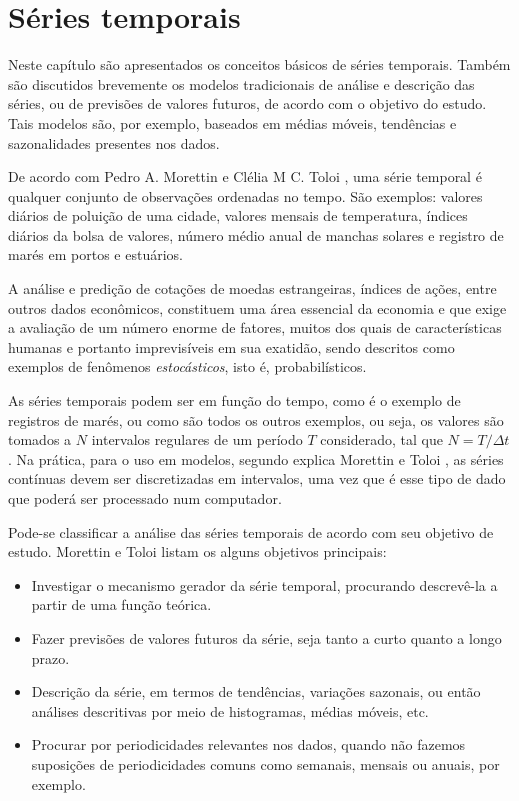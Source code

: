 

\chapter{Séries temporais}
\label{cap:series}

Neste capítulo são apresentados os conceitos básicos de séries temporais. Também são discutidos brevemente os modelos tradicionais de análise e descrição das séries, ou de previsões de valores futuros, de acordo com o objetivo do estudo. Tais modelos são, por exemplo, baseados em médias móveis, tendências e sazonalidades presentes nos dados.

De acordo com Pedro A. Morettin e Clélia M C. Toloi \citep{morettin}, uma série temporal é qualquer conjunto de observações ordenadas no tempo. São exemplos: valores diários de poluição de uma cidade, valores mensais de temperatura, índices diários da bolsa de valores, número médio anual de manchas solares e registro de marés em portos e estuários.

A análise e predição de cotações de moedas estrangeiras, índices de ações, entre outros dados econômicos, constituem uma área essencial da economia e que exige a avaliação de um número enorme de fatores, muitos dos quais de características humanas e portanto imprevisíveis em sua exatidão, sendo descritos como exemplos de fenômenos \emph{estocásticos}, isto é, probabilísticos.

As séries temporais podem ser  em função do tempo, como é o exemplo de registros de marés, ou  como são todos os outros exemplos, ou seja, os valores são tomados a $N$ intervalos regulares de um período $T$ considerado, tal que $N = T/\Delta t$. Na prática, para o uso em modelos, segundo explica Morettin e Toloi \citep{morettin}, as séries contínuas devem ser discretizadas em intervalos, uma vez que é esse tipo de dado que poderá ser processado num computador.

Pode-se classificar a análise das séries temporais de acordo com seu objetivo de estudo. Morettin e Toloi \citep{morettin} listam os alguns objetivos principais:

\begin{itemize}
	\item{Investigar o mecanismo gerador da série temporal, procurando descrevê-la a partir de uma função teórica.}
	\item{Fazer previsões de valores futuros da série, seja tanto a curto quanto a longo prazo.}
	\item{Descrição da série, em termos de tendências, variações sazonais, ou então análises descritivas por meio de histogramas, médias móveis, etc.}
	\item{Procurar por periodicidades relevantes nos dados, quando não fazemos suposições de periodicidades comuns como semanais, mensais ou anuais, por exemplo.}
\end{itemize}

